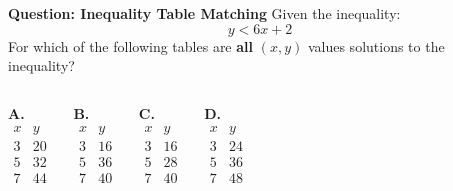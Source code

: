 \documentclass{beamer}
\begin{document}
\begin{frame}{\textbf{Question: Inequality Table Matching}}
    \small
    Given the inequality:
    \[
    y < 6x + 2
    \]
    For which of the following tables are \textbf{all} \((x, y)\) values solutions to the inequality?

    \vspace{5mm}
    \begin{columns}
    \textbf{A.}
    \[
    \begin{array}{c|c}
    x & y \\
    \hline
    3 & 20 \\
    5 & 32 \\
    7 & 44 \\
    \end{array}
    \]

    \textbf{B.}
    \[
    \begin{array}{c|c}
    x & y \\
    \hline
    3 & 16 \\
    5 & 36 \\
    7 & 40 \\
    \end{array}
    \]

    \textbf{C.}
    \[
    \begin{array}{c|c}
    x & y \\
    \hline
    3 & 16 \\
    5 & 28 \\
    7 & 40 \\
    \end{array}
    \]

    \textbf{D.}
    \[
    \begin{array}{c|c}
    x & y \\
    \hline
    3 & 24 \\
    5 & 36 \\
    7 & 48 \\
    \end{array}
    \]
    \end{columns}
\end{frame}
\end{document}
